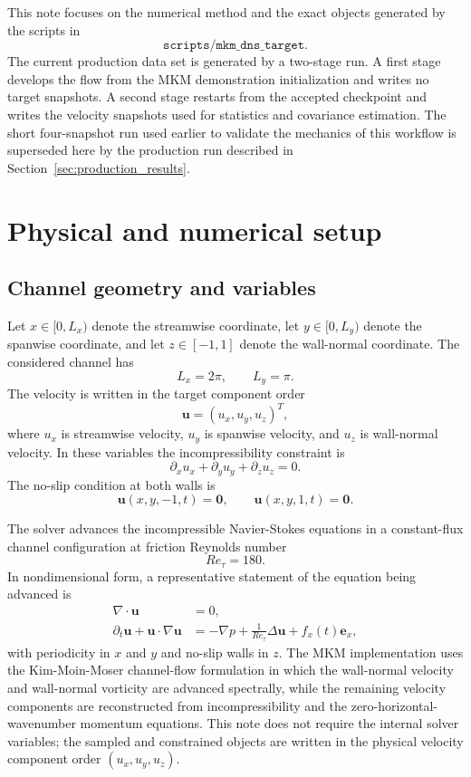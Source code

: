 \documentclass[11pt]{article}
\newcommand{\bfu}{\bm{u}}
\newcommand{\bfzero}{\bm{0}}
\begin{document}
This note focuses on the numerical method and the exact objects generated by
the scripts in
\[
  \texttt{scripts/mkm\_dns\_target}.
\]
The current production data set is generated by a two-stage run. A first stage
develops the flow from the MKM demonstration initialization and writes no
target snapshots. A second stage restarts from the accepted checkpoint and
writes the velocity snapshots used for statistics and covariance estimation.
The short four-snapshot run used earlier to validate the mechanics of this
workflow is superseded here by the production run described in
Section~\ref{sec:production_results}.

\section{Physical and numerical setup}

\subsection{Channel geometry and variables}

Let \(x\in[0,L_x)\) denote the streamwise coordinate, let \(y\in[0,L_y)\)
denote the spanwise coordinate, and let \(z\in[-1,1]\) denote the wall-normal
coordinate. The considered channel has
\[
  L_x = 2\pi,\qquad L_y=\pi.
\]
The velocity is written in the target component order
\[
  \bfu = (u_x,u_y,u_z)^T,
\]
where \(u_x\) is streamwise velocity, \(u_y\) is spanwise velocity, and \(u_z\)
is wall-normal velocity. In these variables the incompressibility constraint is
\begin{equation}
  \partial_x u_x + \partial_y u_y + \partial_z u_z = 0.
  \label{eq:continuous_divergence}
\end{equation}
The no-slip condition at both walls is
\begin{equation}
  \bfu(x,y,-1,t)=\bfzero,\qquad \bfu(x,y,1,t)=\bfzero.
  \label{eq:continuous_noslip}
\end{equation}

The solver advances the incompressible Navier-Stokes equations in a
constant-flux channel configuration at friction Reynolds number
\[
  Re_{\tau}=180.
\]
In nondimensional form, a representative statement of the equation being
advanced is
\begin{align}
  \nabla\cdot\bfu &= 0, \label{eq:ns_div}\\
  \partial_t\bfu + \bfu\cdot\nabla\bfu
    &= -\nabla p + \frac{1}{Re_{\tau}}\Delta\bfu + f_x(t)\bm{e}_x,
    \label{eq:ns_momentum}
\end{align}
with periodicity in \(x\) and \(y\) and no-slip walls in \(z\). The MKM
implementation uses the Kim-Moin-Moser channel-flow formulation in which the
wall-normal velocity and wall-normal vorticity are advanced spectrally, while
the remaining velocity components are reconstructed from incompressibility and
the zero-horizontal-wavenumber momentum equations. This note does not require
the internal solver variables; the sampled and constrained objects are written
in the physical velocity component order \((u_x,u_y,u_z)\).
\end{document}
